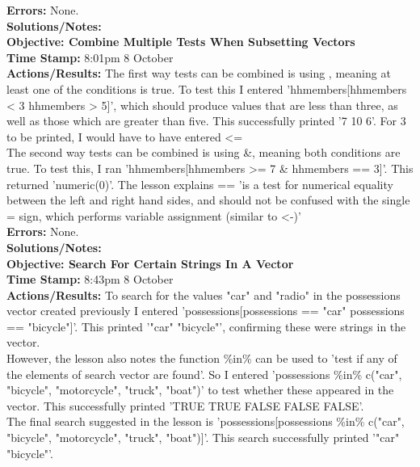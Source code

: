 \documentclass{article}
\begin{document}
\begin{FlushLeft}
\textbf{Errors:} None.\\
\textbf{Solutions/Notes:}\\
\vspace{5mm}
\textbf{Objective: Combine Multiple Tests When Subsetting Vectors}\\ 
\textbf{Time Stamp:} 8:01pm 8 October\\
\textbf{Actions/Results:} The first way tests can be combined is using \textbar{}, meaning at least one of the conditions is true. To test this I entered 'hh\textunderscore members[hh\textunderscore members \textless{} 3 \textbar{} hh\textunderscore members \textgreater{} 5]', which should produce values that are less than three, as well as those which are greater than five. This successfully printed '7 10 6'. For 3 to be printed, I would have to have entered \textless = \\
The second way tests can be combined is using \&, meaning both conditions are true. To test this, I ran 'hh\textunderscore members[hh\textunderscore members \textgreater = 7 \& hh\textunderscore members == 3]'. This returned 'numeric(0)'. The lesson explains == 'is a test for numerical equality between the left and right hand sides, and should not be confused with the single = sign, which performs variable assignment (similar to \textless -)'\\
\textbf{Errors:} None.\\
\textbf{Solutions/Notes:}\\
\vspace{5mm}
\textbf{Objective: Search For Certain Strings In A Vector}\\ 
\textbf{Time Stamp:} 8:43pm 8 October\\
\textbf{Actions/Results:} To search for the values "car" and "radio" in the possessions vector created previously I entered 'possessions[possessions == "car" \textbar{} possessions == "bicycle"]'. This printed '"car" "bicycle"', confirming these were strings in the vector.\\
However, the lesson also notes the function \%in\% can be used to 'test if any of the elements of search vector are found'. So I entered 'possessions \%in\% c("car", "bicycle", "motorcycle", "truck", "boat")' to test whether these appeared in the vector. This successfully printed 'TRUE TRUE FALSE FALSE FALSE'. \\
The final search suggested in the lesson is 'possessions[possessions \%in\% c("car", "bicycle", "motorcycle", "truck", "boat")]'. This search successfully printed '"car" "bicycle"'.\\

\end{FlushLeft}
\end{document}
